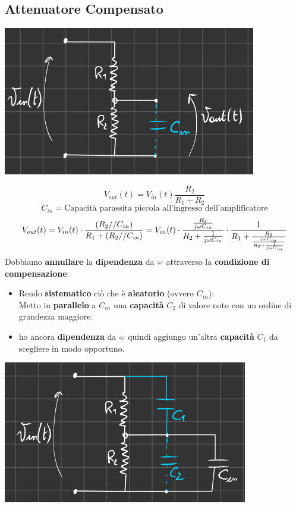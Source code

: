 \subsection{Attenuatore Compensato}
\begin{center}
    \includegraphics[width=.5\textwidth]{Images/figure16.png}
\end{center}
\begin{equation*}
    V_{out}(t) = V_{in}(t)  \frac{R_2}{R_1 + R_2}
\end{equation*}
\begin{equation*}
    C_{in} = \text{Capacità parassita piccola all'ingresso dell'amplificatore}
\end{equation*}
\begin{equation*}
    V_{out}(t) = V_{in}(t) \cdot \frac{(R_2 // C_{in})}{R_1 + (R_2 // C_{in})} = V_{in}(t)\cdot \frac{\frac{R_2}{j\omega C_{in}}}{R_2 + \frac{1}{j\omega C_{in}}} \cdot \frac{1}{R_1 + \frac{R_2}{\frac{j\omega C_{in}}{R_2 + \frac{1}{j\omega C_{in}}}}}
\end{equation*}
Dobbiamo \textbf{annullare} la \textbf{dipendenza} da $\omega$ attraverso la \textbf{condizione di compensazione}:
\begin{itemize}
    \item Rendo \textbf{sistematico} ciò che è \textbf{aleatorio} (ovvero $C_{in}$):\\ 
    Metto in \textbf{parallelo} a $C_{in}$ una \textbf{capacità} $C_2$ di valore noto con un ordine di grandezza maggiore.
    \item ho ancora \textbf{dipendenza} da $\omega$ quindi aggiungo un'altra \textbf{capacità} $C_1$ da scegliere in modo opportuno.
\end{itemize}
\begin{center}
    \includegraphics[width=.5\textwidth]{Images/figure17.png}
\end{center}
